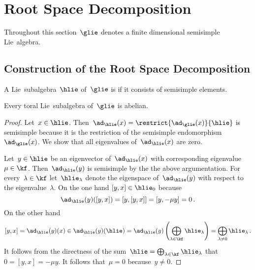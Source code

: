 \section{Root Space Decomposition}




\begin{convention}
  Throughout this section~$\glie$ denotes a finite dimensional semisimple Lie~algebra.
\end{convention}





\subsection{Construction of the Root Space Decomposition}


\begin{definition}
  A Lie~subalgebra~$\hlie$ of~$\glie$ is  if it consists of semisimple elements.
\end{definition}


\begin{lemma}
  Every toral Lie~subalgebra of~$\glie$ is abelian.
\end{lemma}


\begin{proof}
  Let~$x \in \hlie$. 
  Then~$\ad_{\hlie}(x) = \restrict{\ad_{\glie}(x)}{\hlie}$ is semisimple because it is the restriction of the semisimple endomorphism~$\ad_{\glie}(x)$.
  We show that all eigenvalues of~$\ad_{\hlie}(x)$ are zero.
  
  Let~$y \in \hlie$ be an eigenvector of~$\ad_{\hlie}(x)$ with corresponding eigenvalue~$\mu \in \kf$.
  Then~$\ad_{\hlie}(y)$ is semisimple by the the above argumentation.
  For every~$\lambda \in \kf$ let~$\hlie_\lambda$ denote the eigenspace of~$\ad_{\hlie}(y)$ with respect to the eigenvalue~$\lambda$.
  On the one hand $[y,x] \in \hlie_0$ because
  \[
    \ad_{\hlie}(y)([y,x])
    =
    [y,[y,x]]
    =
    [y, -\mu y]
    =
    0 \,.
  \]
  On the other hand
  \[
    [y,x]
    =
    \ad_{\hlie}(y)(x)
    \in
    \ad_{\hlie}(y)(\hlie)
    =
    \ad_{\hlie}(y)\left( \bigoplus_{\lambda \in \kf} \hlie_\lambda \right)
    =
    \bigoplus_{\lambda \neq 0} \hlie_\lambda \,.
  \]
  It follows from the directness of the sum~$\hlie = \bigoplus_{\lambda \in \kf} \hlie_\lambda$ that $0 = [y,x] = -\mu y$.
  It follows that~$\mu = 0$ because~$y \neq 0$.
\end{proof}


